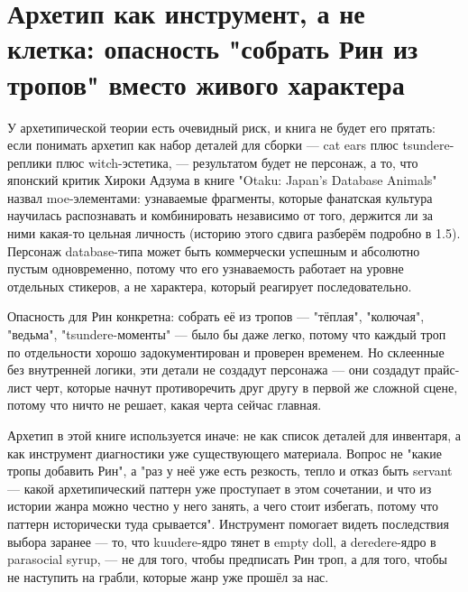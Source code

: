 \section{Архетип как инструмент, а не клетка: опасность "собрать Рин из тропов" вместо живого характера}

У архетипической теории есть очевидный риск, и книга не будет его прятать: если понимать архетип как набор деталей для сборки — cat ears плюс tsundere-реплики плюс witch-эстетика, — результатом будет не персонаж, а то, что японский критик Хироки Адзума в книге "Otaku: Japan's Database Animals" назвал moe-элементами: узнаваемые фрагменты, которые фанатская культура научилась распознавать и комбинировать независимо от того, держится ли за ними какая-то цельная личность (историю этого сдвига разберём подробно в 1.5). Персонаж database-типа может быть коммерчески успешным и абсолютно пустым одновременно, потому что его узнаваемость работает на уровне отдельных стикеров, а не характера, который реагирует последовательно.

Опасность для Рин конкретна: собрать её из тропов — "тёплая", "колючая", "ведьма", "tsundere-моменты" — было бы даже легко, потому что каждый троп по отдельности хорошо задокументирован и проверен временем. Но склеенные без внутренней логики, эти детали не создадут персонажа — они создадут прайс-лист черт, которые начнут противоречить друг другу в первой же сложной сцене, потому что ничто не решает, какая черта сейчас главная.

Архетип в этой книге используется иначе: не как список деталей для инвентаря, а как инструмент диагностики уже существующего материала. Вопрос не "какие тропы добавить Рин", а "раз у неё уже есть резкость, тепло и отказ быть servant — какой архетипический паттерн уже проступает в этом сочетании, и что из истории жанра можно честно у него занять, а чего стоит избегать, потому что паттерн исторически туда срывается". Инструмент помогает видеть последствия выбора заранее — то, что kuudere-ядро тянет в empty doll, а deredere-ядро в parasocial syrup, — не для того, чтобы предписать Рин троп, а для того, чтобы не наступить на грабли, которые жанр уже прошёл за нас.
